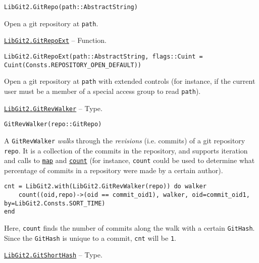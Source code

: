 \begin{adjustwidth}{2em}{0pt}


\begin{verbatim}
LibGit2.GitRepo(path::AbstractString)
\end{verbatim}

Open a git repository at \texttt{path}.



\end{adjustwidth}
\hypertarget{11364757486103041711}{} 
\hyperlink{11364757486103041711}{\texttt{LibGit2.GitRepoExt}}  -- {Function.}

\begin{adjustwidth}{2em}{0pt}


\begin{verbatim}
LibGit2.GitRepoExt(path::AbstractString, flags::Cuint = Cuint(Consts.REPOSITORY_OPEN_DEFAULT))
\end{verbatim}

Open a git repository at \texttt{path} with extended controls (for instance, if the current user must be a member of a special access group to read \texttt{path}).



\end{adjustwidth}
\hypertarget{7800294839307043628}{} 
\hyperlink{7800294839307043628}{\texttt{LibGit2.GitRevWalker}}  -- {Type.}

\begin{adjustwidth}{2em}{0pt}


\begin{verbatim}
GitRevWalker(repo::GitRepo)
\end{verbatim}

A \texttt{GitRevWalker} \emph{walks} through the \emph{revisions} (i.e. commits) of a git repository \texttt{repo}. It is a collection of the commits in the repository, and supports iteration and calls to \hyperlink{546421066875217314}{\texttt{map}} and \hyperlink{3202007276139600178}{\texttt{count}} (for instance, \texttt{count} could be used to determine what percentage of commits in a repository were made by a certain author).


\begin{verbatim}
cnt = LibGit2.with(LibGit2.GitRevWalker(repo)) do walker
    count((oid,repo)->(oid == commit_oid1), walker, oid=commit_oid1, by=LibGit2.Consts.SORT_TIME)
end
\end{verbatim}

Here, \texttt{count} finds the number of commits along the walk with a certain \texttt{GitHash}. Since the \texttt{GitHash} is unique to a commit, \texttt{cnt} will be \texttt{1}.



\end{adjustwidth}
\hypertarget{3676458372916825224}{} 
\hyperlink{3676458372916825224}{\texttt{LibGit2.GitShortHash}}  -- {Type.}

